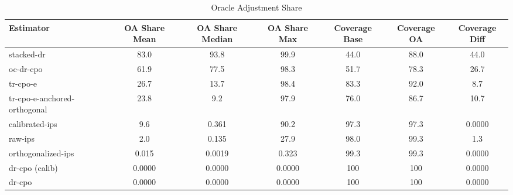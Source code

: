 \begin{table}[htbp]
\centering
\caption{Oracle Adjustment Share}
\label{tab:A4}
\begin{tabular}{l|cccccc}
\toprule
Estimator & OA Share Mean & OA Share Median & OA Share Max & Coverage Base & Coverage OA & Coverage Diff \\
\midrule
stacked-dr & 83.0 & 93.8 & 99.9 & 44.0 & 88.0 & 44.0 \\
oc-dr-cpo & 61.9 & 77.5 & 98.3 & 51.7 & 78.3 & 26.7 \\
tr-cpo-e & 26.7 & 13.7 & 98.4 & 83.3 & 92.0 & 8.7 \\
tr-cpo-e-anchored-orthogonal & 23.8 & 9.2 & 97.9 & 76.0 & 86.7 & 10.7 \\
calibrated-ips & 9.6 & 0.361 & 90.2 & 97.3 & 97.3 & 0.0000 \\
raw-ips & 2.0 & 0.135 & 27.9 & 98.0 & 99.3 & 1.3 \\
orthogonalized-ips & 0.015 & 0.0019 & 0.323 & 99.3 & 99.3 & 0.0000 \\
dr-cpo (calib) & 0.0000 & 0.0000 & 0.0000 & 100 & 100 & 0.0000 \\
dr-cpo & 0.0000 & 0.0000 & 0.0000 & 100 & 100 & 0.0000 \\
\bottomrule
\end{tabular}
\end{table}